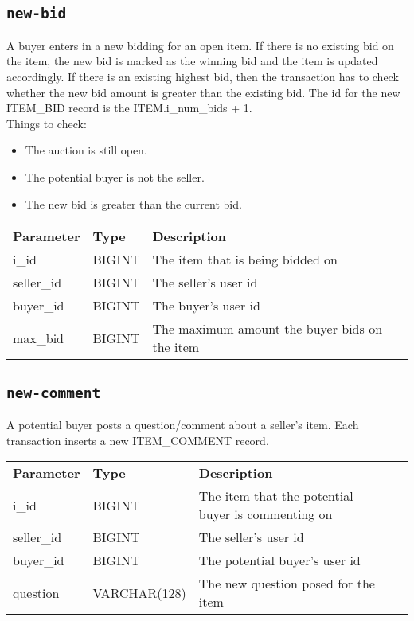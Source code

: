 \documentclass[a4paper,10pt]{article}
\begin{document}
\subsection{\texttt{new-bid}}
A buyer enters in a new bidding for an open item. If there is no existing bid on the item, the new bid is marked as the winning bid and the item is updated accordingly. If there is an existing highest bid, then the transaction has to check whether the new bid amount is greater than the existing bid. The id for the new ITEM\_BID record is the ITEM.i\_num\_bids + 1. \\

\noindent Things to check:
\begin{itemize}
   \item The auction is still open.
   \item The potential buyer is not the seller.
   \item The new bid is greater than the current bid.
\end{itemize}

\noindent \begin{tabular*}{\textwidth}{@{\extracolsep{\fill}} llll}
\textbf{Parameter} & \textbf{Type} & \textbf{Description} \\
i\_id           & BIGINT                & The item that is being bidded on \\
seller\_id      & BIGINT                & The seller's user id \\
buyer\_id       & BIGINT                & The buyer's user id \\
max\_bid        & BIGINT                & The maximum amount the buyer bids on the item \\
\end{tabular*}

\subsection{\texttt{new-comment}}
A potential buyer posts a question/comment about a seller's item. Each transaction inserts a new ITEM\_COMMENT record. \\

\noindent \begin{tabular*}{\textwidth}{@{\extracolsep{\fill}} llll}
\textbf{Parameter} & \textbf{Type} & \textbf{Description} \\
i\_id           & BIGINT                & The item that the potential buyer is commenting on \\
seller\_id      & BIGINT                & The seller's user id \\
buyer\_id       & BIGINT                & The potential buyer's user id \\
question        & VARCHAR(128)          & The new question posed for the item \\
\end{tabular*}
\end{document}
